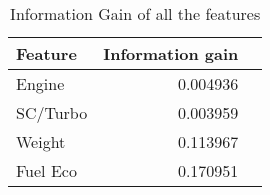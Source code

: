 
\begin{table}[!htp]\centering
    \caption{Information Gain of all the features}\label{tab:firstnode }
    \scriptsize
    \begin{tabular}{lrr}\toprule
        \textbf{Feature} & \textbf{Information gain} \\\midrule
        Engine           & 0.004936                  \\
        SC/Turbo         & 0.003959                  \\
        Weight           & 0.113967                  \\
        Fuel Eco         & 0.170951                  \\
        \bottomrule
    \end{tabular}
\end{table}